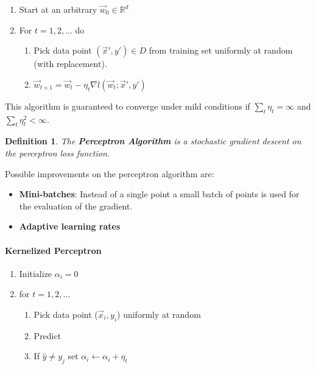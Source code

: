 \documentclass[8pt,a4paper]{scrartcl}
\newtheorem{define}{Definition}
\begin{document}
\begin{multicols*}{3}
\begin{enumerate}
\ncompaq
\item Start at an arbitrary $\vec{w}_0\in\mathbb{R}^d$
\item For $t=1,2,\ldots$ do
\begin{enumerate}
\ncompaq
\item Pick data point $(\vec{x}',y')\in D$ from training set uniformly at random (with replacement).
\item $\vec{w}_{t+1}=\vec{w}_t-\eta_t\nabla l(\vec{w}_t;\vec{x}',y')$
\end{enumerate}
\end{enumerate}

This algorithm is guaranteed to converge under mild conditions if $\sum\limits_{t}\eta_t=\infty$ and $\sum\limits_{t}\eta_t^2<\infty$.

\begin{define}
The \textbf{Perceptron Algorithm} is a stochastic gradient descent on the perceptron loss function.
\end{define}

Possible improvements on the perceptron algorithm are:

\begin{itemize}
\ncompaq
\item \textbf{Mini-batches}: Instead of a single point a small batch of points is used for the evaluation of the gradient.
\item \textbf{Adaptive learning rates} 
\end{itemize}


\paragraph{Kernelized Perceptron}

\begin{enumerate}
\ncompaq
\item Initialize $\alpha_i=0$
\item for $t=1,2,\ldots$
\begin{enumerate}
\ncompaq
\item Pick data point ($\vec{x}_i,y_i$) uniformly at random
\item Predict

\item If $\hat{y}\neq y_j$ set $\alpha_i\leftarrow \alpha_i+\eta_t$
\end{enumerate}
\end{enumerate}


\end{multicols*}
\end{document}
